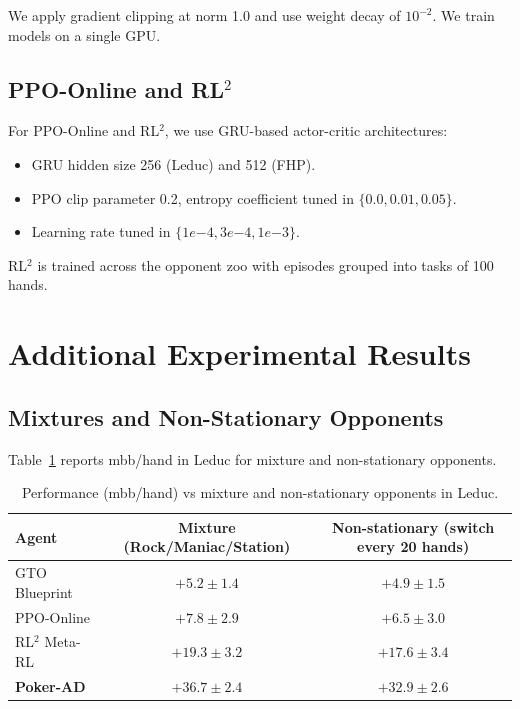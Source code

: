 \documentclass{article}
\begin{document}
We apply gradient clipping at norm 1.0 and use weight decay of $10^{-2}$. We train models on a single GPU.

\subsection{PPO-Online and RL$^2$}

For PPO-Online and RL$^2$, we use GRU-based actor-critic architectures:
\begin{itemize}[leftmargin=*]
    \item GRU hidden size 256 (Leduc) and 512 (FHP).
    \item PPO clip parameter 0.2, entropy coefficient tuned in $\{0.0, 0.01, 0.05\}$.
    \item Learning rate tuned in $\{1e{-4}, 3e{-4}, 1e{-3}\}$.
\end{itemize}
RL$^2$ is trained across the opponent zoo with episodes grouped into tasks of 100 hands.

\section{Additional Experimental Results}
\label{app:extra_results}

\subsection{Mixtures and Non-Stationary Opponents}

Table~\ref{tab:mixt_results} reports mbb/hand in Leduc for mixture and non-stationary opponents.

\begin{table}[h]
    \centering
    \caption{Performance (mbb/hand) vs mixture and non-stationary opponents in Leduc.}
    \label{tab:mixt_results}
    \begin{tabular}{lcc}
        \toprule
        Agent & Mixture (Rock/Maniac/Station) & Non-stationary (switch every 20 hands) \\
        \midrule
        GTO Blueprint & $+5.2 \pm 1.4$ & $+4.9 \pm 1.5$ \\
        PPO-Online & $+7.8 \pm 2.9$ & $+6.5 \pm 3.0$ \\
        RL$^2$ Meta-RL & $+19.3 \pm 3.2$ & $+17.6 \pm 3.4$ \\
        \textbf{Poker-AD} & $\mathbf{+36.7 \pm 2.4}$ & $\mathbf{+32.9 \pm 2.6}$ \\
        \bottomrule
    \end{tabular}
\end{table}
\end{document}
